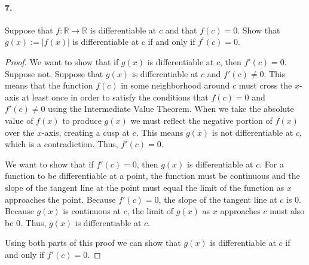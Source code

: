 \documentclass[12pt]{article}
\theoremstyle{remark}
\begin{document}
\paragraph{7.} Suppose that $f: \mathbb{R} \rightarrow \mathbb{R}$ is differentiable at $c$ and that $f(c)=0$. Show that $g(x):=|f(x)|$ is differentiable at $c$ if and only if $f^{\prime}(c)=0$.
\begin{proof}
    We want to show that if $g(x)$ is differentiable at $c$, then $f'(c) = 0$. Suppose not. Suppose that $g(x)$ is differentiable at $c$ and $f'(c) \neq 0$. This means that the function $f(c)$ in some neighborhood around $c$ must cross the $x$-axis at least once in order to satisfy the conditions that $f(c) = 0$ and $f'(c) \neq 0$ using the Intermediate Value Theorem. When we take the absolute value of $f(x)$ to produce $g(x)$ we must reflect the negative portion of $f(x)$ over the $x$-axis, creating a cusp at $c$. This means $g(x)$ is not differentiable at $c$, which is a contradiction. Thus, $f'(c) = 0$.

    We want to show that if $f'(c) = 0$, then $g(x)$ is differentiable at $c$. For a function to be differentiable at a point, the function must be continuous and the slope of the tangent line at the point must equal the limit of the function as $x$ approaches the point. Because $f'(c) = 0$, the slope of the tangent line at $c$ is 0. Because $g(x)$ is continuous at $c$, the limit of $g(x)$ as $x$ approaches $c$ must also be 0. Thus, $g(x)$ is differentiable at $c$.

    Using both parts of this proof we can show that $g(x)$ is differentiable at $c$ if and only if $f'(c) = 0$.
\end{proof}
\end{document}
